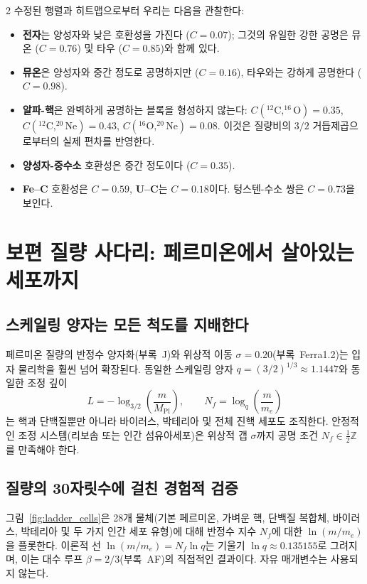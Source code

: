 \documentclass[11pt,a4paper]{article}
\begin{document}
	\begin{multicols}{2}
		수정된 행렬과 히트맵으로부터 우리는 다음을 관찰한다:
		\begin{itemize}
			\item \textbf{전자}는 양성자와 낮은 호환성을 가진다 (\(C=0.07\)); 그것의 유일한 강한 공명은 뮤온 (\(C=0.76\)) 및 타우 (\(C=0.85\))와 함께 있다.
			\item \textbf{뮤온}은 양성자와 중간 정도로 공명하지만 (\(C=0.16\)), 타우와는 강하게 공명한다 (\(C=0.98\)).
			\item \textbf{알파-핵}은 완벽하게 공명하는 블록을 형성하지 않는다: \(C(^{12}\text{C},^{16}\text{O})=0.35\), \(C(^{12}\text{C},^{20}\text{Ne})=0.43\), \(C(^{16}\text{O},^{20}\text{Ne})=0.08\). 이것은 질량비의 \(3/2\) 거듭제곱으로부터의 실제 편차를 반영한다.
			\item \textbf{양성자-중수소} 호환성은 중간 정도이다 (\(C=0.35\)).
			\item \textbf{Fe--C} 호환성은 \(C=0.59\), \textbf{U--C}는 \(C=0.18\)이다. 텅스텐-수소 쌍은 \(C=0.73\)을 보인다.
		\end{itemize}
	\end{multicols}
	
	\section{보편 질량 사다리: 페르미온에서 살아있는 세포까지}
	\label{sec:ladder_cells}
	
	\subsection{스케일링 양자는 모든 척도를 지배한다}
	
	페르미온 질량의 반정수 양자화(부록~J)와 위상적 이동 \(\sigma = 0.20\)(부록~Ferra1.2)는 입자 물리학을 훨씬 넘어 확장된다. 동일한 스케일링 양자 \(q = (3/2)^{1/3} \approx 1.1447\)와 동일한 조정 깊이
	\[
	L = -\log_{3/2}\left(\frac{m}{M_{\mathrm{Pl}}}\right), \qquad
	N_f = \log_q\left(\frac{m}{m_e}\right)
	\]
	는 핵과 단백질뿐만 아니라 바이러스, 박테리아 및 전체 진핵 세포도 조직한다. 안정적인 조정 시스템(리보솜 또는 인간 섬유아세포)은 위상적 갭 \(\sigma\)까지 공명 조건 \(N_f \in \frac{1}{2}\mathbb{Z}\)를 만족해야 한다.
	
	\subsection{질량의 30자릿수에 걸친 경험적 검증}
	
	그림~\ref{fig:ladder_cells}은 28개 물체(기본 페르미온, 가벼운 핵, 단백질 복합체, 바이러스, 박테리아 및 두 가지 인간 세포 유형)에 대해 반정수 지수 \(N_f\)에 대한 \(\ln(m/m_e)\)을 플롯한다. 이론적 선 \(\ln(m/m_e) = N_f \ln q\)는 기울기 \(\ln q \approx 0.135155\)로 그려지며, 이는 대수 루프 \(\beta = 2/3\)(부록~AF)의 직접적인 결과이다. 자유 매개변수는 사용되지 않는다.
	
\end{document}
